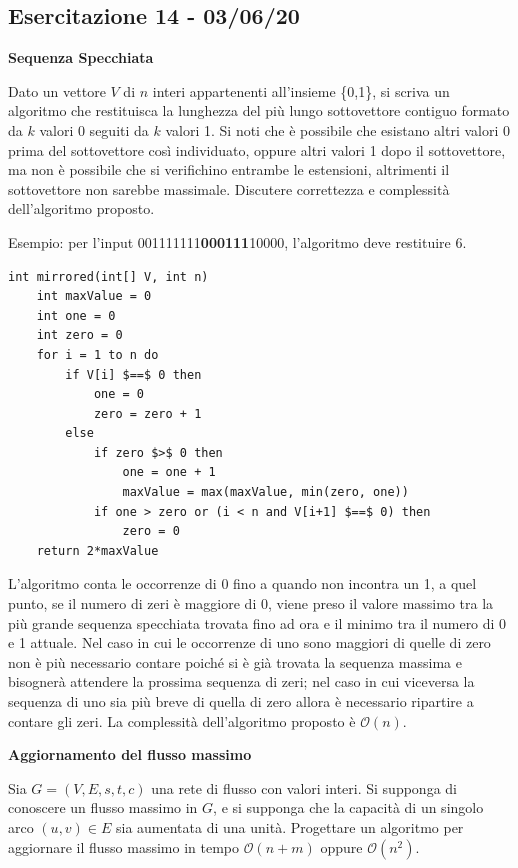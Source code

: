 \documentclass[../cheatSheetAlgoritmi.tex]{subfiles}
\begin{document}
\subsection{Esercitazione 14 - 03/06/20}
\textbf{Sequenza Specchiata}

Dato un vettore $V$ di $n$ interi appartenenti all'insieme \{0,1\}, si scriva un algoritmo che restituisca la lunghezza del più lungo sottovettore contiguo formato da $k$ valori 0 seguiti da $k$ valori 1. Si noti che è possibile che esistano altri valori 0 prima del sottovettore così individuato, oppure altri valori 1 dopo il sottovettore, ma non è possibile che si verifichino entrambe le estensioni, altrimenti il sottovettore non sarebbe massimale. Discutere correttezza e complessità dell'algoritmo proposto.

Esempio: per l’input 001111111\textbf{000111}10000, l'algoritmo deve restituire 6.

\begin{lstlisting}[caption=Sequenza Specchiata]
int mirrored(int[] V, int n)
	int maxValue = 0
	int one = 0
	int zero = 0
	for i = 1 to n do
		if V[i] $==$ 0 then
			one = 0
			zero = zero + 1
		else
			if zero $>$ 0 then
				one = one + 1
				maxValue = max(maxValue, min(zero, one))
			if one > zero or (i < n and V[i+1] $==$ 0) then
				zero = 0
	return 2*maxValue
\end{lstlisting}
L'algoritmo conta le occorrenze di 0 fino a quando non incontra un 1, a quel punto, se il numero di zeri è maggiore di 0, viene preso il valore massimo tra la più grande sequenza specchiata trovata fino ad ora e il minimo tra il numero di 0 e 1 attuale. Nel caso in cui le occorrenze di uno sono maggiori di quelle di zero non è più necessario contare poiché si è già trovata la sequenza massima e bisognerà attendere la prossima sequenza di zeri; nel caso in cui viceversa la sequenza di uno sia più breve di quella di zero allora è necessario ripartire a contare gli zeri. La complessità dell'algoritmo proposto è $\mathcal{O}(n)$.

\bigskip

\textbf{Aggiornamento del flusso massimo}

Sia $G= (V, E, s, t, c)$ una rete di flusso con valori interi. Si supponga di conoscere un flusso massimo in $G$, e si supponga che la capacità di un singolo arco $(u, v) \in E$ sia aumentata di una unità. Progettare un algoritmo per aggiornare il flusso massimo in tempo $\mathcal{O}(n+m)$ oppure $\mathcal{O}(n^{2})$.
\end{document}
